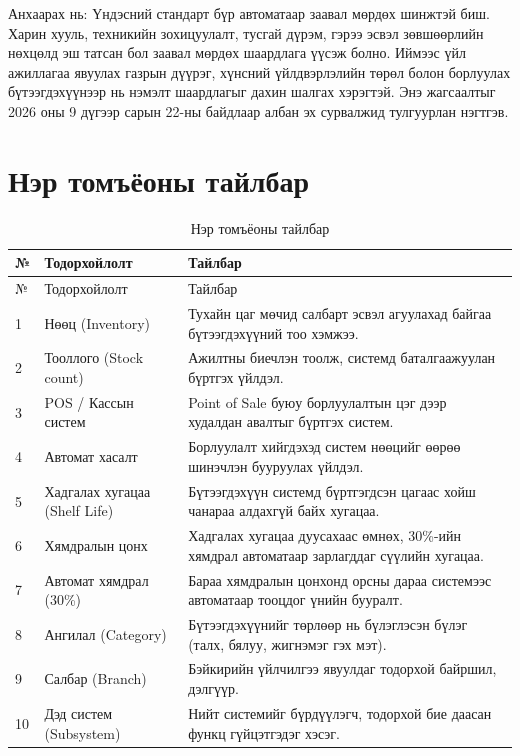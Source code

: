 Анхаарах нь: Үндэсний стандарт бүр автоматаар заавал мөрдөх шинжтэй биш. Харин хууль, техникийн зохицуулалт, тусгай дүрэм, гэрээ эсвэл зөвшөөрлийн нөхцөлд эш татсан бол заавал мөрдөх шаардлага үүсэж болно. Иймээс үйл ажиллагаа явуулах газрын дүүрэг, хүнсний үйлдвэрлэлийн төрөл болон борлуулах бүтээгдэхүүнээр нь нэмэлт шаардлагыг дахин шалгах хэрэгтэй. Энэ жагсаалтыг 2026 оны 9 дүгээр сарын 22-ны байдлаар албан эх сурвалжид тулгуурлан нэгтгэв.

\section{Нэр томъёоны тайлбар}
	\begin{longtable}{|p{0.5cm}|p{4cm}|p{8.5cm}|}
        \caption{Нэр томъёоны тайлбар}
        \label{table:1} \\
            \hline
                № & Тодорхойлолт & Тайлбар \\ 
            \hline
            \endfirsthead
            \hline
                № & Тодорхойлолт & Тайлбар \\ 
            \hline
            \endhead
                1 & Нөөц (Inventory) & Тухайн цаг мөчид салбарт эсвэл агуулахад байгаа бүтээгдэхүүний тоо хэмжээ. \\ 
            \hline
                2 & Тооллого (Stock count) & Ажилтны биечлэн тоолж, системд баталгаажуулан бүртгэх үйлдэл. \\ 
            \hline
                3 & POS / Кассын систем & Point of Sale буюу борлуулалтын цэг дээр худалдан авалтыг бүртгэх систем. \\ 
            \hline
                4 & Автомат хасалт & Борлуулалт хийгдэхэд систем нөөцийг өөрөө шинэчлэн бууруулах үйлдэл. \\ 
            \hline
                5 & Хадгалах хугацаа (Shelf Life) & Бүтээгдэхүүн системд бүртгэгдсэн цагаас хойш чанараа алдахгүй байх хугацаа. \\ 
            \hline
                6 & Хямдралын цонх & Хадгалах хугацаа дуусахаас өмнөх, 30\%-ийн хямдрал автоматаар зарлагддаг сүүлийн хугацаа. \\ 
            \hline
                7 & Автомат хямдрал (30\%) & Бараа хямдралын цонхонд орсны дараа системээс автоматаар тооцдог үнийн бууралт. \\ 
            \hline
                8 & Ангилал (Category) & Бүтээгдэхүүнийг төрлөөр нь бүлэглэсэн бүлэг (талх, бялуу, жигнэмэг гэх мэт). \\ 
            \hline
                9 & Салбар (Branch) & Бэйкирийн үйлчилгээ явуулдаг тодорхой байршил, дэлгүүр. \\ 
            \hline
                10 & Дэд систем (Subsystem) & Нийт системийг бүрдүүлэгч, тодорхой бие даасан функц гүйцэтгэдэг хэсэг. \\ 
            \hline
    \end{longtable}

